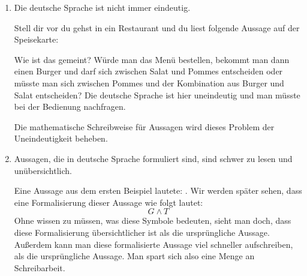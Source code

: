 \documentclass[../../main.tex]{subfiles}
\begin{document}
\begin{enumerate}
    \item Die deutsche Sprache ist nicht immer eindeutig. 
        \begin{example}
        Stell dir vor du gehst in ein Restaurant und du liest folgende Aussage auf der
        Speisekarte: 
        
         
         Wie ist das gemeint? Würde man das Menü bestellen, bekommt man dann einen Burger und darf sich zwischen Salat und Pommes entscheiden oder müsste man sich zwischen Pommes und der Kombination aus Burger und Salat entscheiden? Die deutsche Sprache ist hier uneindeutig und man müsste bei der Bedienung nachfragen.
         
        \end{example}
        Die mathematische Schreibweise für Aussagen wird dieses Problem der Uneindeutigkeit beheben.
    \item Aussagen, die in deutsche Sprache formuliert sind, sind schwer zu lesen und unübersichtlich.
    \begin{example}
        Eine Aussage aus dem ersten Beispiel lautete: . Wir werden später sehen, dass eine Formalisierung dieser Aussage wie folgt lautet:
        \[ G \land T\]
        Ohne wissen zu müssen, was diese Symbole bedeuten, sieht man doch, dass diese Formalisierung übersichtlicher ist als die ursprüngliche Aussage. Außerdem kann man diese formalisierte Aussage viel schneller aufschreiben, als die ursprüngliche Aussage. Man spart sich also eine Menge an Schreibarbeit.
    \end{example}
\end{enumerate}
\end{document}
